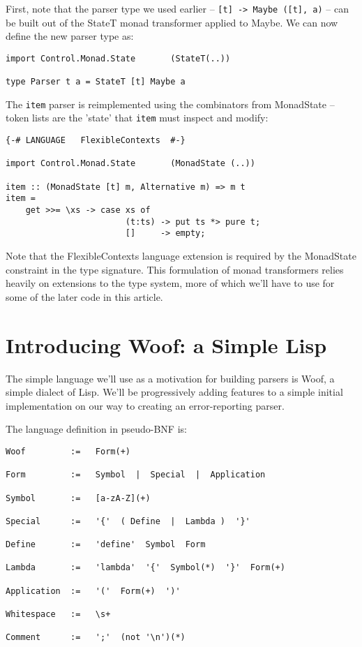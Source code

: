 \documentclass{tmr}
\begin{document}
First, note that the parser type we used earlier -- \verb+[t] -> Maybe ([t], a)+
-- can be built out of the StateT monad transformer applied to Maybe.  We can 
now define the new parser type as:
\begin{verbatim}
import Control.Monad.State       (StateT(..))

type Parser t a = StateT [t] Maybe a
\end{verbatim}

The \verb+item+ parser is reimplemented using the combinators from MonadState --
token lists are the 'state' that \verb+item+ must inspect and modify:
\begin{verbatim}
{-# LANGUAGE   FlexibleContexts  #-}

import Control.Monad.State       (MonadState (..))

item :: (MonadState [t] m, Alternative m) => m t
item =
    get >>= \xs -> case xs of
                        (t:ts) -> put ts *> pure t;
                        []     -> empty;
\end{verbatim}
Note that the FlexibleContexts language extension is required by the 
MonadState constraint in the type signature.  This formulation of monad
transformers relies heavily on extensions to the type system, more of which 
we'll have to use for some of the later code in this article.




\section{Introducing Woof:  a Simple Lisp}
The simple language we'll use as a motivation for building parsers is Woof, a 
simple dialect of Lisp.  We'll be progressively adding features to a simple 
initial implementation on our way to creating an error-reporting parser.

The language definition in pseudo-BNF \cite{bnf} is:

\begin{verbatim}
Woof         :=   Form(+)

Form         :=   Symbol  |  Special  |  Application

Symbol       :=   [a-zA-Z](+)

Special      :=   '{'  ( Define  |  Lambda )  '}'

Define       :=   'define'  Symbol  Form

Lambda       :=   'lambda'  '{'  Symbol(*)  '}'  Form(+)

Application  :=   '('  Form(+)  ')'

Whitespace   :=   \s+

Comment      :=   ';'  (not '\n')(*)
\end{verbatim}
\end{document}
